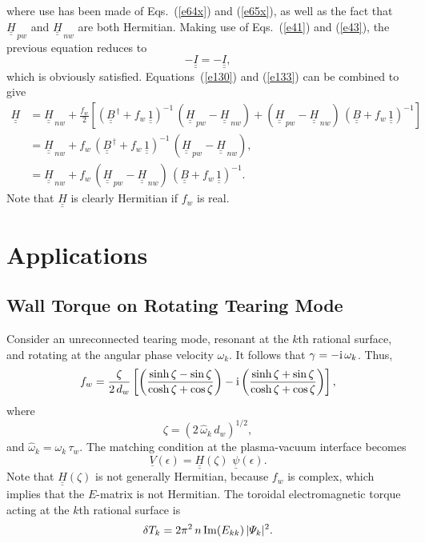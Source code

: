 \documentclass[12pt,prb,aps,notitlepage]{revtex4-1}
\begin{document}
where use has been made of Eqs.~(\ref{e64x}) and (\ref{e65x}), as well as the fact that $\underline{\underline{H}}_{\,pw}$ and $\underline{\underline{H}}_{\,nw}$ are both Hermitian. 
Making use of Eqs.~(\ref{e41}) and (\ref{e43}), the previous equation reduces to 
\begin{equation}
-\underline{\underline{I}}= -\underline{\underline{I}},
\end{equation}
which is obviously satisfied. Equations~(\ref{e130}) and (\ref{e133}) can
be combined to give
\begin{align}\label{e128x}
\underline{\underline{H}} &= \underline{\underline{H}}_{\,nw} 
+\frac{ f_w}{2}\left[ 
(\underline{\underline{B}}^{\,\dag}+f_w\,\underline{\underline{1}})^{-1}\,( \underline{\underline{H}}_{\,pw} - \underline{\underline{H}}_{\,nw} )
+(\underline{\underline{H}}_{\,pw} - \underline{\underline{H}}_{\,nw} )\,(\underline{\underline{B}}+f_w\,\underline{\underline{1}})^{-1} \right]\nonumber\\[0.5ex]
&= \underline{\underline{H}}_{\,nw} +f_w\,(\underline{\underline{B}}^{\,\dag}+f_w\,\underline{\underline{1}})^{-1}\,( \underline{\underline{H}}_{\,pw} - \underline{\underline{H}}_{\,nw} ),\nonumber\\[0.5ex]
&= \underline{\underline{H}}_{\,nw} +f_w\,(\underline{\underline{H}}_{\,pw} - \underline{\underline{H}}_{\,nw} )\,(\underline{\underline{B}}+f_w\,\underline{\underline{1}})^{-1}.
\end{align}
Note that $\underline{\underline{H}}$ is clearly Hermitian if $f_w$ is real. 

\section{Applications}
\subsection{Wall Torque on Rotating Tearing Mode}
Consider an unreconnected tearing mode, resonant at the $k$th rational surface, and rotating at the angular phase velocity $\omega_k$. It follows that
$\gamma=-{\rm i}\,\omega_k$. Thus, 
\begin{equation}
f_w = \frac{\zeta}{2\,d_w}\left[\left(\frac{\sinh\zeta - \sin\zeta}{\cosh\zeta+\cos\zeta}\right)-{\rm i}\left(\frac{\sinh\zeta+ \sin\zeta}{\cosh\zeta+\cos\zeta}\right)\right],
\end{equation}
where
\begin{equation}
\zeta = (2\,\hat{\omega}_k\,d_w)^{1/2},
\end{equation}
and $\hat{\omega}_k=\omega_k\,\tau_w$. 
The matching condition at the plasma-vacuum interface becomes 
\begin{equation}
\underline{V}(\epsilon)= \underline{\underline{H}}(\zeta)\,\,\underline{\psi}(\epsilon).
\end{equation}
Note that $\underline{\underline{H}}(\zeta)$ is not generally Hermitian, because $f_w$ is complex,  which implies that
the $E$-matrix is not Hermitian. The toroidal electromagnetic torque acting at the $k$th rational surface is
\begin{equation}
\delta T_k = 2\pi^2\,n\,{\rm Im}(E_{kk})\,|{\mit\Psi}_k|^2.
\end{equation}
\end{document}
